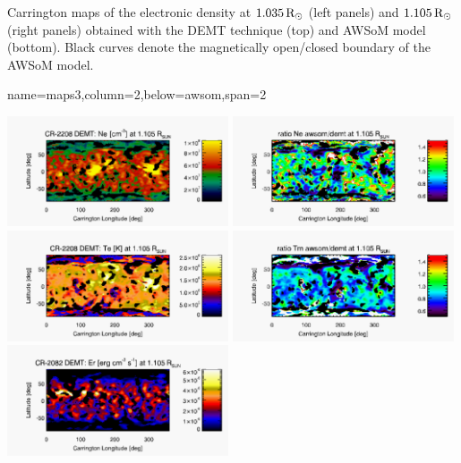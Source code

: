 \documentclass[paperwidth=100cm,paperheight=120cm]{baposter}
\def\azul#1{\textcolor{blue}{#1}}
\begin{document}
\begin{poster}
{\begin{center}
\end{center}
\vskip -0.16cm
{\footnotesize\sf
Carrington maps of the electronic density at $1.035 \, {\rm R}_\odot$ (left panels) and $1.105 \, {\rm R}_\odot$ (right panels) obtained with the DEMT technique (top) and AWSoM model (bottom). Black curves denote the magnetically open/closed boundary of the AWSoM model. 

}
}

{name=maps3,column=2,below=awsom,span=2}{
{\footnotesize\sf
\begin{center}
{\includegraphics[width=0.49\textwidth]{map_Ne_CR2208_DEMT-AIA_H1_L522_r3d_1105_Rsun.pdf}}
{\includegraphics[width=0.49\textwidth]{map_ratio_Ne_awsom_2208_185-Ne_CR2208_DEMT-AIA_H1_L522_r3d_1105_Rsun.pdf}}
{\includegraphics[width=0.49\textwidth]{map_Tm_CR2208_DEMT-AIA_H1_L522_r3d_1105_Rsun.pdf}}
{\includegraphics[width=0.49\textwidth]{map_ratio_Te_awsom_2208_185-Tm_CR2208_DEMT-AIA_H1_L522_r3d_1105_Rsun.pdf}}
{\includegraphics[width=0.49\textwidth]{map_Er_CR2082_DEMT-EUVI_behind_H1-L3523_r3d_1105_Rsun.pdf}}
\end{center}
}
}


\end{poster}
\end{document}
